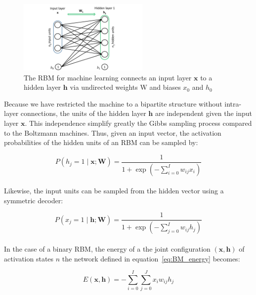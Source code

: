 \documentclass[a4paper,11pt]{report}
\begin{document}
		\begin{figure}[H]
			\begin{center}
				\includegraphics[width=2.5in]{Images/RBM_DNN/rbm_IJ.pdf}
				\caption[The structure of the restricted Boltzmann machine]{The RBM for machine learning connects an input layer $\mathbf{x}$ to a hidden layer $\mathbf{h}$ via undirected weights W and biases $x_{0}$ and $h_{0}$}
				\label{fig:RBM for DBN}
			\end{center}
		\end{figure}
		
		Because we have restricted the machine to a bipartite structure without intra-layer connections, the units of the hidden layer $\mathbf{h}$ are independent given the input layer $\mathbf{x}$. This independence simplify greatly the Gibbs sampling process compared to the Boltzmann machines. Thus, given an input vector, the activation probabilities of the hidden units of an RBM can be sampled by:
		
		\begin{equation}
			P(h_{j}=1 \mid \mathbf{x;W}) = \frac{1}{1 + \exp{(-\sum_{i=0}^{I}{w_{ij}x_{i}})}}
			\label{eq:RBM first sampling}
		\end{equation}\\
		
		Likewise, the input units can be sampled from the hidden vector using a symmetric decoder:
		
		\begin{equation}
			P(x_{j}=1 \mid \mathbf{h;W}) = \frac{1}{1 + \exp{(-\sum_{j=0}^{I}{w_{ij}h_{j}})}}
			\label{eq:RBM second sampling}		
		\end{equation}\\		
		
		In the case of a binary RBM, the energy of a the joint configuration $(\mathbf{x},\mathbf{h})$ of activation states $n$ the network defined in equation~\ref{eq:BM_energy} becomes: 
		
		\begin{equation}
			E(\mathbf{x},\mathbf{h}) = - \sum_{i=0}^{I}\sum_{j=0}^{J}x_{i}w_{ij}h_{j}
		\end{equation}\\
		
\end{document}
